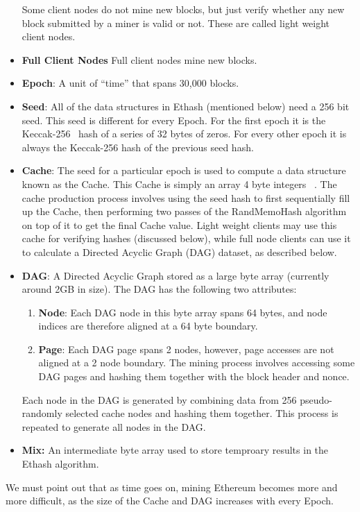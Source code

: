 \documentclass[runningheads]{llncs}
\newcommand{\trishita}[1]{}%
\begin{document}
\begin{itemize}
Some client nodes do not mine new blocks, but just verify whether any new block submitted by a miner is valid or not. These are called light weight client nodes.
\item \textbf{Full Client Nodes}
Full client nodes mine new blocks.
\item \textbf{Epoch}: A unit of ``time'' that spans 30,000 blocks.
\item \textbf{Seed}: All of the data structures in Ethash (mentioned below) need a 256 bit seed. This seed is different for every Epoch. For the first epoch it is the Keccak-256~\trishita{CITE} hash of a series of 32 bytes of zeros. For every other epoch it is always the Keccak-256 hash of the previous seed hash. 
\item \textbf{Cache}: The seed for a particular epoch is used to compute a data structure known as the Cache. This Cache is simply an array 4 byte integers ~\cite{Ethmining}. The cache production process involves using the seed hash to first sequentially fill up the Cache, then performing two passes of the RandMemoHash algorithm~\cite{randmemohash} on top of it to get the final Cache value. 
Light weight clients may use this cache for verifying hashes (discussed below), while full node clients can use it to calculate a Directed Acyclic Graph (DAG) dataset, as described below. 
\item \textbf{DAG}: A Directed Acyclic Graph stored as a large byte array (currently around 2GB in size). The DAG has the following two attributes:
  \begin{enumerate}
  \item \textbf{Node}: Each DAG node in this byte array spans 64 bytes, and node indices are therefore aligned at a 64 byte boundary.
  \item \textbf{Page}: Each DAG page spans 2 nodes, however, page accesses are not aligned at a 2 node boundary. The mining process involves accessing some DAG pages and hashing them together with the block header and nonce.
  \end{enumerate}
Each node in the DAG is generated by combining data from 256 pseudo-randomly selected cache nodes and hashing them together. This process is repeated to generate all nodes in the DAG.
\item \textbf{Mix:} An intermediate byte array used to store temproary results in the Ethash algorithm.
\end{itemize}
We must point out that as time goes on, mining Ethereum becomes more and more difficult, as the size of the Cache and DAG increases with every Epoch. 
\end{document}
